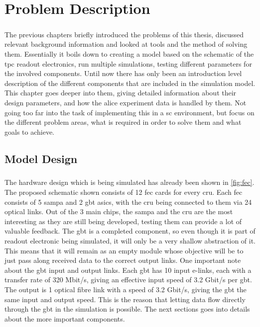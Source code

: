 \documentclass[a4paper, 12pt]{report}
\begin{document}
\chapter{Problem Description}
\label{cha:4}

\paragraph{}
The previous chapters briefly introduced the problems of this thesis, discussed relevant background information and looked at tools and the method of solving them.
Essentially it boils down to creating a model based on the schematic of the \gls{tpc} readout electronics, run multiple simulations, testing different parameters for the involved components.
Until now there has only been an introduction level description of the different components that are included in the simulation model.
This chapter goes deeper into them, giving detailed information about their design parameters, and how the \gls{alice} experiment data is handled by them.
Not going too far into the task of implementing this in a \gls{sc} environment, but focus on the different problem areas, what is required in order to solve them and what goals to achieve.

\section{Model Design}
\paragraph{}
The hardware design which is being simulated has already been shown in \ref{fig:fec}.
The proposed schematic shown consists of 12 \gls{fec} cards for every \gls{cru}.
Each \gls{fec} consists of 5 \gls{sampa} and 2 \gls{gbt} \glspl{asic}, with the \gls{cru} being connected to them via 24 optical links.
Out of the 3 main chips, the \gls{sampa} and the \gls{cru} are the most interesting as they are still being developed, testing them can provide a lot of valuable feedback.
The \gls{gbt} is a completed component, so even though it is part of readout electronic being simulated, it will only be a very shallow abstraction of it.
This means that it will remain as an empty module whose objective will be to just pass along received data to the correct output links.
One important note about the \gls{gbt} input and output links.
Each \gls{gbt} has 10 input e-links, each with a transfer rate of 320 Mbit/s, giving an effective input speed of 3.2 Gbit/s per \gls{gbt}.
The output is 1 optical fibre link with a speed of 3.2 Gbit/s, giving the \gls{gbt} the same input and output speed.
This is the reason that letting data flow directly through the \gls{gbt} in the simulation is possible.
The next sections goes into details about the more important components.
\end{document}
